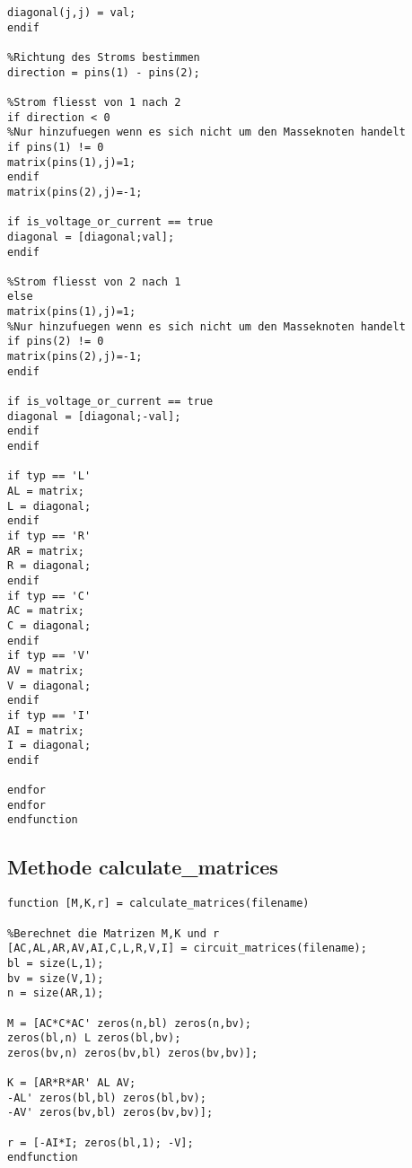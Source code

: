 \begin{lstlisting}[caption={Methode \texttt{circuit\_matrices} in Octave}, label=circuit_matrices]
diagonal(j,j) = val;
endif

%Richtung des Stroms bestimmen
direction = pins(1) - pins(2);

%Strom fliesst von 1 nach 2
if direction < 0
%Nur hinzufuegen wenn es sich nicht um den Masseknoten handelt
if pins(1) != 0
matrix(pins(1),j)=1;
endif
matrix(pins(2),j)=-1;

if is_voltage_or_current == true
diagonal = [diagonal;val];
endif

%Strom fliesst von 2 nach 1
else
matrix(pins(1),j)=1;
%Nur hinzufuegen wenn es sich nicht um den Masseknoten handelt
if pins(2) != 0
matrix(pins(2),j)=-1;
endif

if is_voltage_or_current == true
diagonal = [diagonal;-val];
endif
endif

if typ == 'L'
AL = matrix;
L = diagonal;
endif 
if typ == 'R'
AR = matrix;
R = diagonal;
endif  
if typ == 'C'
AC = matrix;
C = diagonal;
endif  
if typ == 'V'
AV = matrix;
V = diagonal;
endif 
if typ == 'I'
AI = matrix;
I = diagonal;  
endif

endfor
endfor
endfunction
\end{lstlisting}

\subsection*{Methode calculate\_matrices}
\begin{lstlisting}[caption={Methode \texttt{calculate\_matrices} in Octave}, label=calculate_matrices]
function [M,K,r] = calculate_matrices(filename)

%Berechnet die Matrizen M,K und r  
[AC,AL,AR,AV,AI,C,L,R,V,I] = circuit_matrices(filename);
bl = size(L,1);
bv = size(V,1);
n = size(AR,1);

M = [AC*C*AC' zeros(n,bl) zeros(n,bv);
zeros(bl,n) L zeros(bl,bv);
zeros(bv,n) zeros(bv,bl) zeros(bv,bv)];

K = [AR*R*AR' AL AV;
-AL' zeros(bl,bl) zeros(bl,bv);
-AV' zeros(bv,bl) zeros(bv,bv)];

r = [-AI*I; zeros(bl,1); -V];
endfunction
\end{lstlisting}

